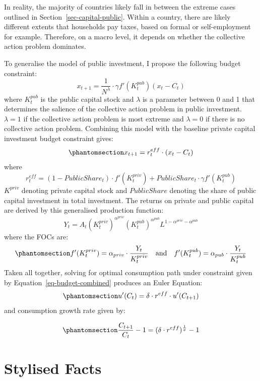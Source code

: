 \documentclass[
  11pt]{article}
\begin{document}
In reality, the majority of countries likely fall in between the extreme
cases outlined in Section~\ref{sec-capital-public}. Within a country,
there are likely different extents that households pay taxes, based on
formal or self-employment for example. Therefore, on a macro level, it
depends on whether the collective action problem dominates.

To generalise the model of public investment, I propose the following
budget constraint: \[
x_{t+1} = \frac{1}{N^\lambda} \cdot \gamma f'(K_t^{pub})(x_t - C_t)
\]where \(K_t^{pub}\) is the public capital stock and \(\lambda\) is a
parameter between 0 and 1 that determines the salience of the collective
action problem in public investment. \(\lambda = 1\) if the collective
action problem is most extreme and \(\lambda = 0\) if there is no
collective action problem. Combining this model with the baseline
private capital investment budget constraint gives:
\begin{equation}\phantomsection\label{eq-budget-combined}{
x_{t+1} = r_t^{eff} \cdot (x_t - C_t)
}\end{equation} where \[
r_t^{eff} = (1-PublicShare_t) \cdot f'(K^{priv}_t) + PublicShare_t \cdot \gamma f'(K^{pub}_t)
\] \(K^{priv}\) denoting private capital stock and \(PublicShare\)
denoting the share of public capital investment in total investment. The
returns on private and public capital are derived by this generalised
production function: \[
Y_t = A_t(K_t^{priv})^{\alpha^{priv}}(K_t^{pub})^{\alpha^{pub}}L^{1-\alpha^{priv}-\alpha^{pub}}
\] where the FOCs are:
\begin{equation}\phantomsection\label{eq-returns}{
f'(K_t^{priv}) = \alpha_{priv} \cdot \frac{Y_t}{K_t^{priv}} \quad \text{and} \quad f'(K_t^{pub}) = \alpha_{pub} \cdot \frac{Y_t}{K_t^{pub}}
}\end{equation} Taken all together, solving for optimal consumption path
under constraint given by Equation~\ref{eq-budget-combined} produces an
Euler Equation:
\begin{equation}\phantomsection\label{eq-euler-combined}{
u'(C_t) = \delta \cdot r^{eff} \cdot u'(C_{t+1})
}\end{equation} and consumption growth rate given by:

\begin{equation}\phantomsection\label{eq-growth-combined}{
\frac{C_{t+1}}{C_t} - 1 = (\delta \cdot r^{eff})^{\frac{1}{\sigma}} - 1
}\end{equation}

\section{Stylised Facts}\label{stylised-facts}

\clearpage


\renewcommand\refname{References}

\end{document}
